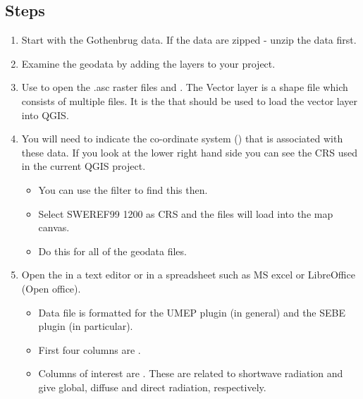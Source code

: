 \documentclass[letterpaper,10pt,english]{sphinxmanual}
\begin{document}
\subsection{Steps}
\label{\detokenize{Tutorials/SEBE:steps}}\begin{enumerate}
\item {} 
Start with the Gothenbrug data. If the data are zipped - unzip the data first.

\item {} 
Examine the geodata by adding the layers to your project.

\item {} 
Use  to open the .asc raster files
and . The Vector layer is a
shape file which consists of multiple files. It is the
 that should be used to load the vector layer into
QGIS.

\item {} 
You will need to indicate the co-ordinate system
()
that is associated with these data. If you look at the lower right
hand side you can see the CRS used in the current QGIS project.
\begin{itemize}
\item {} 
You can use the filter to find this then.

\item {} 
Select SWEREF99 1200 as CRS and the files will load into the map
canvas.

\item {} 
Do this for all of the geodata files.

\end{itemize}

\item {} 
Open the  in a text editor or in a spreadsheet
such as MS excel or LibreOffice (Open office).
\begin{itemize}
\item {} 
Data file is formatted for the UMEP plugin (in general) and the
SEBE plugin (in particular).

\item {} 
First four columns are .

\item {} 
Columns of interest are . These are
related to shortwave radiation and give global, diffuse and direct
radiation, respectively.


\end{itemize}
\end{enumerate}
\end{document}
